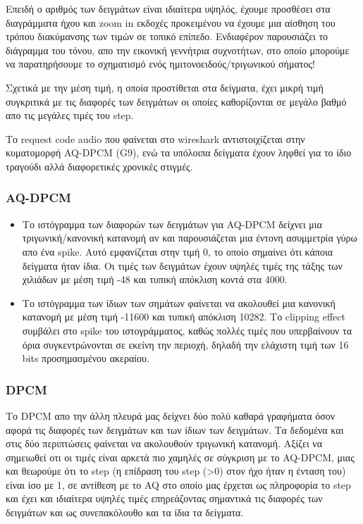 \documentclass[hidelinks, 12pt, a4paper]{article}
\begin{document}
Επειδή ο αριθμός των δειγμάτων είναι ιδιαίτερα υψηλός, έχουμε προσθέσει στα διαγράμματα ήχου και zoom in εκδοχές προκειμένου να έχουμε μια αίσθηση του τρόπου διακύμανσης των τιμών σε τοπικό επίπεδο. Ενδιαφέρον παρουσιάζει το διάγραμμα του τόνου, απο την εικονική γεννήτρια συχνοτήτων, στο οποίο μπορούμε να παρατηρήσουμε το σχηματισμό ενός ημιτονοειδούς/τριγωνικού σήματος!

Σχετικά με την μέση τιμή, η οποία προστίθεται στα δείγματα, έχει μικρή τιμή συγκριτικά με τις διαφορές των δειγμάτων οι οποίες καθορίζονται σε μεγάλο βαθμό απο τις μεγάλες τιμές του step.

Το request code audio που φαίνεται στο wireshark αντιστοιχίζεται στην κυματομορφή AQ-DPCM (G9), ενώ τα υπόλοιπα δείγματα έχουν ληφθεί για το ίδιο τραγούδι αλλά διαφορετικές χρονικές στιγμές.

\subsubsection{AQ-DPCM}

\begin{itemize}
    \item Το ιστόγραμμα των διαφορών των δειγμάτων για AQ-DPCM δείχνει μια τριγωνική/κανονική κατανομή αν και παρουσιάζεται μια έντονη ασυμμετρία γύρω απο ένα spike. Αυτό εμφανίζεται στην τιμή 0, το οποίο σημαίνει ότι κάποια δείγματα ήταν ίδια. Οι τιμές των δειγμάτων έχουν υψηλές τιμές της τάξης των χιλιάδων με μέση τιμή -48 και τυπική απόκλιση κοντά στα 4000.
    \item Το ιστόγραμμα των ίδιων των σημάτων φαίνεται να ακολουθεί μια κανονική κατανομή με μέση τιμή -11600 και τυπική απόκλιση 10282. Το clipping effect συμβάλει στο spike του ιστογράμματος, καθώς πολλές τιμές που υπερβαίνουν τα όρια συγκεντρώνονται σε εκείνη την περιοχή, δηλαδή την ελάχιστη τιμή των 16 bits προσημασμένου ακεραίου.
\end{itemize}


\subsubsection{DPCM}

Το DPCM απο την άλλη πλευρά μας δείχνει δύο πολύ καθαρά γραφήματα όσον αφορά τις διαφορές των δειγμάτων και των ίδιων των δειγμάτων. Τα δεδομένα και στις δύο περιπτώσεις φαίνεται να ακολουθούν τριγωνική κατανομή. Αξίζει να σημειωθεί οτι οι τιμές είναι αρκετά πιο χαμηλές σε σύγκριση με το AQ-DPCM, μιας και θεωρούμε ότι το step (η επίδραση του step (>0) στον ήχο ήταν η ένταση του) είναι ίσο με 1, σε αντίθεση με το AQ στο οποίο μας έρχεται ως πληροφορία το step και έχει και ιδιαίτερα υψηλές τιμές επηρεάζοντας σημαντικά τις διαφορές των δειγμάτων και ως συνεπακόλουθο και τα ίδια τα δείγματα.
\end{document}
